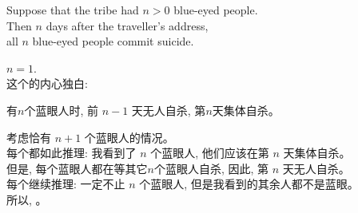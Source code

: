 \begin{frame}{}
  \begin{center}

    \pause
    \vspace{0.80cm}
    \begin{theorem}
      \begin{center}
        Suppose that the tribe had $n > 0$ blue-eyed people. \\[6pt]
        Then $n$ days after the traveller's address, \\[6pt]
        all $n$ blue-eyed people commit suicide.
      \end{center}
    \end{theorem}
  \end{center}
\end{frame}

\begin{frame}{}
  \begin{center}

    \pause
    \vspace{0.30cm}
    \begin{description}
      \setlength{\itemsep}{8pt}
      \item[基础步骤:] $n = 1$. \\ \pause
        这个的内心独白:  \pause
      \item[归纳假设:] 有$n$个蓝眼人时, 前 $n-1$ 天无人自杀, 第$n$天集体自杀。\pause
      \item[归纳步骤:] 考虑恰有 $n+1$ 个蓝眼人的情况。 \\[6pt] \pause
        每个都如此推理: 我看到了 $n$ 个蓝眼人, 他们应该在第 $n$ 天集体自杀。
        \\[6pt] \pause
        但是, 每个蓝眼人都在等其它$n$个蓝眼人自杀, 因此, 第 $n$ 天无人自杀。
        \\[6pt] \pause
        每个继续推理: 一定不止 $n$ 个蓝眼人, 但是我看到的其余人都不是蓝眼。
        \\[6pt] \pause
        所以, 。
    \end{description}
  \end{center}
\end{frame}

